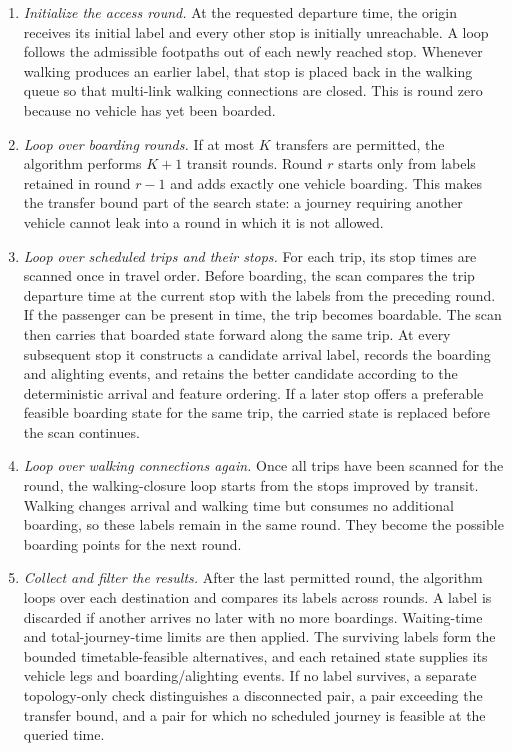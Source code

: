 \begin{enumerate}
  \item \emph{Initialize the access round.}  At the requested departure time,
        the origin receives its initial label and every other stop is initially
        unreachable.  A loop follows the admissible footpaths out of each
        newly reached stop.  Whenever walking produces an earlier label, that
        stop is placed back in the walking queue so that multi-link walking
        connections are closed.  This is round zero because no vehicle has yet
        been boarded.

  \item \emph{Loop over boarding rounds.}  If at most $K$ transfers are
        permitted, the algorithm performs $K+1$ transit rounds.  Round $r$
        starts only from labels retained in round $r-1$ and adds exactly one
        vehicle boarding.  This makes the transfer bound part of the search
        state: a journey requiring another vehicle cannot leak into a round in
        which it is not allowed.

  \item \emph{Loop over scheduled trips and their stops.}  For each trip, its
        stop times are scanned once in travel order.  Before boarding, the scan
        compares the trip departure time at the current stop with the labels
        from the preceding round.  If the passenger can be present in time,
        the trip becomes boardable.  The scan then carries that boarded state
        forward along the same trip.  At every subsequent stop it constructs
        a candidate arrival label, records the boarding and alighting events,
        and retains the better candidate according to the deterministic
        arrival and feature ordering.  If a later stop offers a preferable
        feasible boarding state for the same trip, the carried state is
        replaced before the scan continues.

  \item \emph{Loop over walking connections again.}  Once all trips have been
        scanned for the round, the walking-closure loop starts from the stops
        improved by transit.  Walking changes arrival and walking time but
        consumes no additional boarding, so these labels remain in the same
        round.  They become the possible boarding points for the next round.

  \item \emph{Collect and filter the results.}  After the last permitted
        round, the algorithm loops over each destination and compares its
        labels across rounds.  A label is discarded if another arrives no
        later with no more boardings.  Waiting-time and total-journey-time
        limits are then applied.  The surviving labels form the bounded
        timetable-feasible alternatives, and each retained state supplies its
        vehicle legs and boarding/alighting events.  If no label
        survives, a separate topology-only check distinguishes a disconnected
        pair, a pair exceeding the transfer bound, and a pair for which no
        scheduled journey is feasible at the queried time.
\end{enumerate}

